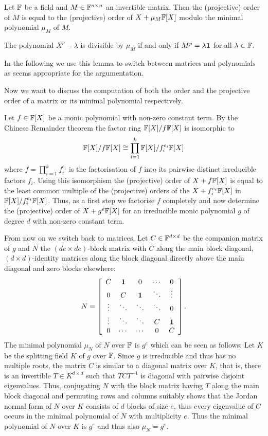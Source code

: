 \begin{Lemm}
Let\/ $\mathbb{F}$ be a field and $M \in \mathbb{F}^{n \times n}$ an invertible matrix.
Then the (projective) order of $M$ is equal to the (projective) order of
$X + \mu_M \mathbb{F}[X]$ modulo the minimal polynomial $\mu_M$ of $M$.
\end{Lemm}
\proofbeg 
The polynomial $X^p-\lambda$ is divisible by $\mu_M$ if and
only if $M^p = \lambda \mathbf{1}$ for all $\lambda \in \mathbb{F}$.
\proofend

In the following we use this lemma to switch between matrices and
polynomials as seems appropriate for the argumentation.

Now we want to discuss the computation of both the order and the
projective order of a matrix or its minimal polynomial respectively.

Let $f \in \mathbb{F}[X]$ be a monic polynomial with non-zero constant term. 
By the Chinese Remainder theorem the factor ring
$\mathbb{F}[X]/f\mathbb{F}[X]$ is isomorphic to
\[ \mathbb{F}[X]/f\mathbb{F}[X] \cong
   \prod_{i=1}^k \mathbb{F}[X]/f_i^{e_i} \mathbb{F}[X] \]
where $f = \prod_{i=1}^k f_i^{e_i}$ is the factorisation of $f$ into
its pairwise distinct irreducible factors $f_i$. Using this
isomorphism the (projective) order of $X+f\mathbb{F}[X]$ is equal to the least 
common multiple of the (projective) orders of the $X + f_i^{e_i}
\mathbb{F}[X]$ in $\mathbb{F}[X]/f_i^{e_i}\mathbb{F}[X]$. Thus, as a first step we factorise
$f$ completely and now determine the (projective) order of
$X+g^e\mathbb{F}[X]$ for an irreducible monic polynomial $g$ of degree $d$ 
with non-zero constant term.

From now on we switch back to matrices. Let $C \in \mathbb{F}^{d \times d}$ be 
the companion matrix of $g$ and $N$ the $(de \times de)$-block matrix with 
$C$ along the main block diagonal, $(d \times d)$-identity matrices
along the block diagonal directly above the main diagonal and zero blocks
elsewhere:
\[ N = \left[ \begin{array}{ccccc}
    C      & \mathbf{1}   & 0      & \cdots & 0 \\
    0      & C      & \mathbf{1}   & \ddots & \vdots \\
    \vdots & \ddots & \ddots & \ddots & 0 \\
    \vdots & \ddots & \ddots & C      & \mathbf{1} \\
    0      & \cdots & \cdots & 0      & C
\end{array} \right]. \]
The minimal polynomial $\mu_N$ of $N$ over $\mathbb{F}$ is $g^e$ 
which can be seen as follows:
Let $K$ be the splitting field $K$ of $g$ over $\mathbb{F}$. Since $g$ is
irreducible and thus has no multiple roots, the 
matrix $C$ is similar to a diagonal matrix over $K$, that is, there is an
invertible $T \in K^{d \times d}$ such that $TCT^{-1}$ is diagonal
with pairwise disjoint eigenvalues.
Thus, conjugating $N$ with the block matrix having $T$ along the
main block diagonal and permuting rows and columns suitably shows that
the Jordan normal form of $N$ over $K$ consists of $d$ blocks of
size $e$, thus every eigenvalue of $C$ occurs in the minimal
polynomial of $N$ with multiplicity $e$. Thus the minimal polynomial
of $N$ over $K$ is $g^e$ and thus also $\mu_N = g^e$.


